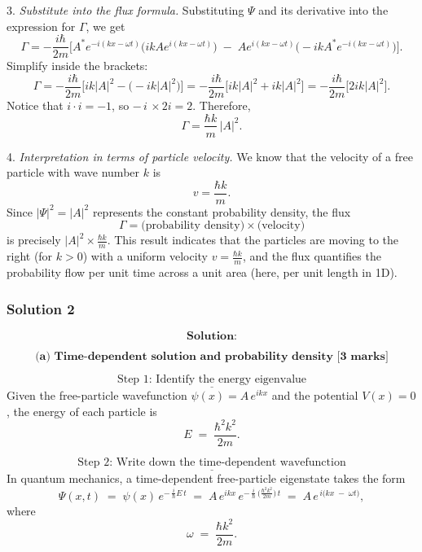\documentclass{article}
\begin{document}
3. \emph{Substitute into the flux formula.}  
   Substituting $\Psi$ and its derivative into the expression for $\Gamma$, we get
   \[
     \Gamma 
     = -\frac{i\hbar}{2m} 
       \Big[
         A^* e^{-i(kx - \omega t)} \big(i k A e^{i(kx - \omega t)}\big)
         \;-\;
         A e^{i(kx - \omega t)} \big(-i k A^* e^{-i(kx - \omega t)}\big)
       \Big].
   \]
   Simplify inside the brackets:
   \[
     \Gamma
     = -\frac{i\hbar}{2m}
       \Big[
         i k |A|^2 
         - 
         \big(-i k |A|^2\big)
       \Big]
     = -\frac{i\hbar}{2m}
       \Big[
         i k |A|^2 + i k |A|^2
       \Big]
     = -\frac{i\hbar}{2m}
       \Big[
         2i k |A|^2
       \Big].
   \]
   Notice that $i \cdot i = -1$, so $-\,i\,\times 2i = 2$. Therefore,
   \[
     \Gamma = \frac{\hbar k}{m} \, |A|^2.
   \]

4. \emph{Interpretation in terms of particle velocity.}  
   We know that the velocity of a free particle with wave number $k$ is 
   \[
     v = \frac{\hbar k}{m}.
   \]
   Since $|\Psi|^2 = |A|^2$ represents the constant probability density, the flux 
   \[
     \Gamma = \bigl(\text{probability density}\bigr) 
              \times 
              \bigl(\text{velocity}\bigr)
   \]
   is precisely $|A|^2 \times \frac{\hbar k}{m}$. This result indicates that the particles are moving to the right (for $k>0$) with a uniform velocity $v = \tfrac{\hbar k}{m}$, and the flux quantifies the probability flow per unit time across a unit area (here, per unit length in 1D).

\subsubsection{Solution 2}
\[
\textbf{Solution:}
\]

\[
\textbf{(a) Time-dependent solution and probability density [3 marks]}
\]

\[
\underline{\text{Step 1: Identify the energy eigenvalue}}
\]
Given the free-particle wavefunction \(\psi(x) = A\, e^{i k x}\) and the potential \(V(x) = 0\), the energy of each particle is
\[
E \;=\; \frac{\hbar^2 k^2}{2m}.
\]

\[
\underline{\text{Step 2: Write down the time-dependent wavefunction}}
\]
In quantum mechanics, a time-dependent free-particle eigenstate takes the form
\[
\Psi(x, t)
\;=\; \psi(x)\,e^{-\,\tfrac{i}{\hbar}E\,t}
\;=\;
A\, e^{i k x}\,e^{-\,\tfrac{i}{\hbar}\,\bigl(\tfrac{\hbar^2 k^2}{2m}\bigr)\,t}
\;=\;
A \, e^{\,i\bigl(k x \;-\;\omega t\bigr)},
\]
where
\[
\omega \;=\; \frac{\hbar k^2}{2m}.
\]
\end{document}
